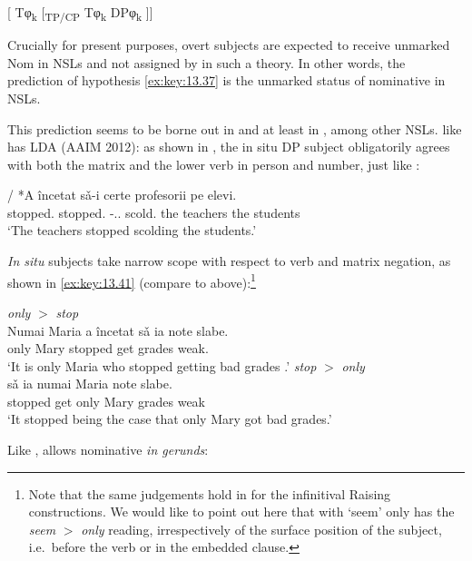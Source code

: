 \documentclass[output=paper]{langsci/langscibook}
\begin{document}
\begin{exe}
\ea\label{ex:key:13.39}
    {}[ Tφ\textsubscript{k} [\textsubscript{TP/CP} Tφ\textsubscript{k} DPφ\textsubscript{k} ]]
\z

Crucially for present purposes, overt subjects are expected to receive unmarked
Nom in \glspl{NSL} and not \Nom{} assigned by  in such a theory. In other words, the
prediction of hypothesis \eqref{ex:key:13.37} is the unmarked status of nominative
in NSLs.

This prediction seems to be borne out in  and at least in , among
other NSLs.  like  has \gls{LDA} (AAIM 2012): as shown in
, the in situ DP subject obligatorily agrees with both the
matrix and the lower verb in person and number, just like :

\ea\label{ex:key:13.40}
    \sn
     / {*A încetat} sǎ-i certe profesorii pe elevi.\\
    stopped.\Tpl{} {} \hphantom{*}stopped.\Tsg{} \Sbjv{}-\Cl{}.\Tpl{}.\Acc{} scold.\Tpl{} {the teachers} the students\\
    \glt ‘The teachers stopped scolding the students.’
\z

\emph{In situ} subjects take narrow scope with respect to  verb and
matrix negation, as shown in \eqref{ex:key:13.41} (compare to 
above):\footnote{Note that the same judgements hold in  for the
    infinitival Raising constructions. We would like to point out here that
    with `seem'  only has the \emph{seem} $>$ \emph{only} reading,
irrespectively of the surface position of the subject, i.e.\ before the 
verb or in the embedded clause.}

\ea%
    \label{ex:key:13.41}
    \ea \emph{only} $>$ \emph{stop}\\
    \gll   Numai Maria {a încetat} sǎ   ia note slabe.\\
	    only Mary stopped \Sbjv{} get grades weak.\\
	\glt     ‘It is only Maria who stopped getting bad grades .’
    \ex \emph{stop} $>$ \emph{only}\\
     sǎ  ia numai Maria note slabe.\\
	    stopped \Sbjv{} get only Mary grades weak\\
	\glt     ‘It stopped being the case that only Mary got bad grades.’
    \z
\z

Like ,  allows nominative \emph{in gerunds}:


\end{exe}
\end{document}
